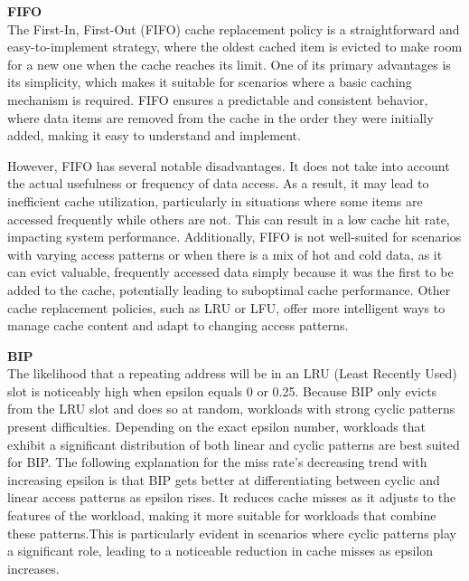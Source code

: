 \documentclass{article}
\begin{document}
\begin{description}
\item \textbf{FIFO} \\
The First-In, First-Out (FIFO) cache replacement policy is a straightforward and easy-to-implement strategy, where the oldest cached item is evicted to make room for a new one when the cache reaches its limit. One of its primary advantages is its simplicity, which makes it suitable for scenarios where a basic caching mechanism is required. FIFO ensures a predictable and consistent behavior, where data items are removed from the cache in the order they were initially added, making it easy to understand and implement.

However, FIFO has several notable disadvantages. It does not take into account the actual usefulness or frequency of data access. As a result, it may lead to inefficient cache utilization, particularly in situations where some items are accessed frequently while others are not. This can result in a low cache hit rate, impacting system performance. Additionally, FIFO is not well-suited for scenarios with varying access patterns or when there is a mix of hot and cold data, as it can evict valuable, frequently accessed data simply because it was the first to be added to the cache, potentially leading to suboptimal cache performance. Other cache replacement policies, such as LRU or LFU, offer more intelligent ways to manage cache content and adapt to changing access patterns.

\item \textbf{BIP} \\
The likelihood that a repeating address will be in an LRU (Least Recently Used) slot is noticeably high when epsilon equals 0 or 0.25. Because BIP only evicts from the LRU slot and does so at random, workloads with strong cyclic patterns present difficulties. Depending on the exact epsilon number, workloads that exhibit a significant distribution of both linear and cyclic patterns are best suited for BIP. The following explanation for the miss rate's decreasing trend with increasing epsilon is that BIP gets better at differentiating between cyclic and linear access patterns as epsilon rises. It reduces cache misses as it adjusts to the features of the workload, making it more suitable for workloads that combine these patterns.This is particularly evident in scenarios where cyclic patterns play a significant role, leading to a noticeable reduction in cache misses as epsilon
increases.
\end{description}
\end{document}
